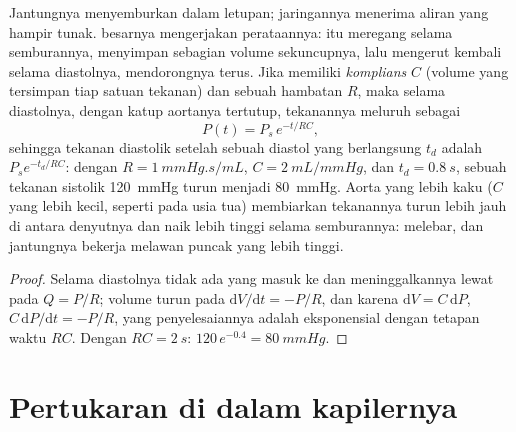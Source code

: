 \begin{theorem}\label{thm:b2:blood-circulation:windkessel}
Jantungnya menyemburkan dalam letupan; jaringannya menerima aliran yang
hampir tunak.  besarnya mengerjakan perataannya:  itu
meregang selama semburannya, menyimpan sebagian volume sekuncupnya, lalu
mengerut kembali selama diastolnya, mendorongnya terus. Jika 
memiliki \emph{komplians} $C$ (volume yang tersimpan tiap satuan
tekanan) dan  sebuah hambatan $R$, maka selama diastolnya,
dengan katup aortanya tertutup, tekanannya meluruh sebagai
\[
P(t) = P_{s}\,e^{-t/RC},
\]
sehingga tekanan diastolik setelah sebuah diastol yang berlangsung
$t_d$ adalah $P_s e^{-t_d/RC}$: dengan $R = \qty{1}{mmHg.s/mL}$, $C =
\qty{2}{mL/mmHg}$, dan $t_d = \qty{0.8}{s}$, sebuah tekanan sistolik
\qty{120}{mmHg} turun menjadi \qty{80}{mmHg}. Aorta yang lebih kaku
($C$ yang lebih kecil, seperti pada usia tua) membiarkan tekanannya
turun lebih jauh di antara denyutnya dan naik lebih tinggi selama
semburannya: \emph{} melebar, dan jantungnya bekerja
melawan puncak yang lebih tinggi.
\end{theorem}
\begin{proof}
Selama diastolnya tidak ada  yang masuk ke  dan 
meninggalkannya lewat  pada $Q = P/R$; volume 
turun pada $\mathrm{d}V/\mathrm{d}t = -P/R$, dan karena $\mathrm{d}V = C\,
\mathrm{d}P$, $C\,\mathrm{d}P/\mathrm{d}t = -P/R$, yang penyelesaiannya
adalah eksponensial dengan tetapan waktu $RC$. Dengan $RC = \qty{2}{s}$:
$120\,e^{-0.4} = \qty{80}{mmHg}$.
\end{proof}

\section{Pertukaran di dalam kapilernya}


